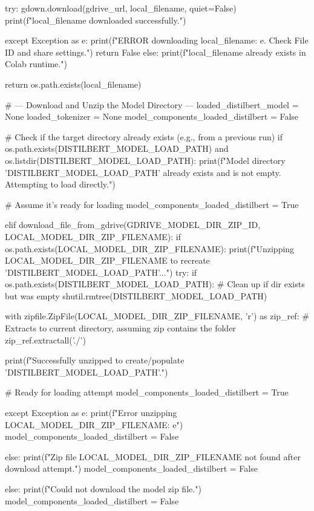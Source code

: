 \begin{ffcode}
        try:
            gdown.download(gdrive_url, local_filename, quiet=False)
            print(f"{local_filename} downloaded successfully.")

        except Exception as e:
            print(f"ERROR downloading {local_filename}: {e}. Check File ID and share settings.")
            return False
    else:
        print(f"{local_filename} already exists in Colab runtime.")

    return os.path.exists(local_filename)

# --- Download and Unzip the Model Directory ---
loaded_distilbert_model = None
loaded_tokenizer = None
model_components_loaded_distilbert = False

# Check if the target directory already exists (e.g., from a previous run)
if os.path.exists(DISTILBERT_MODEL_LOAD_PATH) and os.listdir(DISTILBERT_MODEL_LOAD_PATH):
    print(f"Model directory '{DISTILBERT_MODEL_LOAD_PATH}' already exists and is not empty. Attempting to load directly.")

    # Assume it's ready for loading
    model_components_loaded_distilbert = True

elif download_file_from_gdrive(GDRIVE_MODEL_DIR_ZIP_ID, LOCAL_MODEL_DIR_ZIP_FILENAME):
    if os.path.exists(LOCAL_MODEL_DIR_ZIP_FILENAME):
        print(f"Unzipping {LOCAL_MODEL_DIR_ZIP_FILENAME} to recreate '{DISTILBERT_MODEL_LOAD_PATH}'...")
        try:
            if os.path.exists(DISTILBERT_MODEL_LOAD_PATH): # Clean up if dir exists but was empty
                shutil.rmtree(DISTILBERT_MODEL_LOAD_PATH)

            with zipfile.ZipFile(LOCAL_MODEL_DIR_ZIP_FILENAME, 'r') as zip_ref:
                # Extracts to current directory, assuming zip contains the folder
                zip_ref.extractall('./')

            print(f"Successfully unzipped to create/populate '{DISTILBERT_MODEL_LOAD_PATH}'.")

            # Ready for loading attempt
            model_components_loaded_distilbert = True

        except Exception as e:
            print(f"Error unzipping {LOCAL_MODEL_DIR_ZIP_FILENAME}: {e}")
            model_components_loaded_distilbert = False

    else:
        print(f"Zip file {LOCAL_MODEL_DIR_ZIP_FILENAME} not found after download attempt.")
        model_components_loaded_distilbert = False

else:
    print(f"Could not download the model zip file.")
    model_components_loaded_distilbert = False


\end{ffcode}
